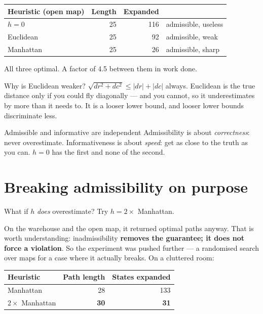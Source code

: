 \documentclass[11pt,a4paper]{article}
\begin{document}
\begin{center}
\begin{tabular}{@{}lrrl@{}}
\toprule
\textbf{Heuristic (open map)} & \textbf{Length} & \textbf{Expanded} & \\
\midrule
$h = 0$          & 25 & 116 & admissible, useless \\
Euclidean        & 25 &  92 & admissible, weak \\
Manhattan        & 25 &  26 & admissible, sharp \\
\bottomrule
\end{tabular}
\end{center}

All three optimal. A factor of 4.5 between them in work done.

Why is Euclidean weaker? $\sqrt{dr^2 + dc^2} \leq |dr| + |dc|$ always. Euclidean
is the true distance only if you could fly diagonally --- and you cannot, so it
underestimates by more than it needs to. It is a looser lower bound, and looser
lower bounds discriminate less.

\begin{keyidea}{Admissible and informative are independent}
Admissibility is about \emph{correctness}: never overestimate. Informativeness is
about \emph{speed}: get as close to the truth as you can. $h=0$ has the first and
none of the second.
\end{keyidea}

\section{Breaking admissibility on purpose}

What if $h$ \emph{does} overestimate? Try $h = 2 \times$ Manhattan.

On the warehouse and the open map, it returned optimal paths anyway. That is
worth understanding: inadmissibility \textbf{removes the guarantee; it does not
force a violation}. So the experiment was pushed further --- a randomised search
over maps for a case where it actually breaks. On a cluttered room:

\begin{center}
\begin{tabular}{@{}lrr@{}}
\toprule
\textbf{Heuristic} & \textbf{Path length} & \textbf{States expanded} \\
\midrule
Manhattan          & 28 & 133 \\
$2 \times$ Manhattan & \textbf{30} & \textbf{31} \\
\bottomrule
\end{tabular}
\end{center}
\end{document}
